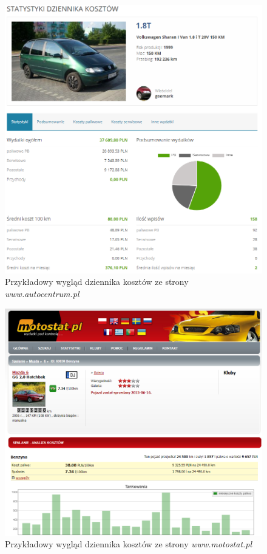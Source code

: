 \documentclass[12pt]{article}
\begin{document}
\begin{figure}[H]
	\centering
		\includegraphics[scale=0.5]{autocentrum.png}
	\caption{Przykładowy wygląd dziennika kosztów ze strony \textit{www.autocentrum.pl} \cite{autocentrum}}
	\label{autocentrum}
\end{figure}
\begin{figure}[H]
	\centering
		\includegraphics[scale=0.5]{motostat.png}
	\caption{Przykładowy wygląd dziennika kosztów ze strony \textit{www.motostat.pl} \cite{motostat}}
	\label{motostat}
\end{figure}
\end{document}
